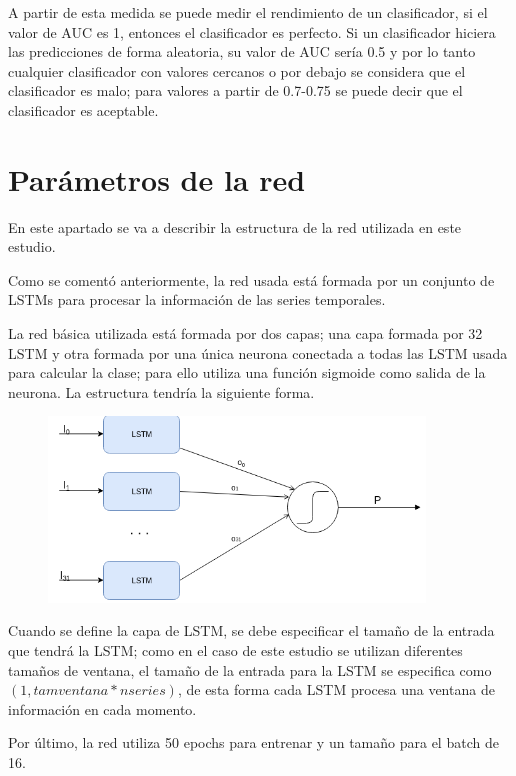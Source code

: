 A partir de esta medida se puede medir el rendimiento de un clasificador, si el valor de AUC es 1, entonces el clasificador es perfecto. Si un clasificador hiciera las predicciones de forma aleatoria, su valor de AUC sería 0.5 y por lo tanto cualquier clasificador con valores cercanos o por debajo se considera que el clasificador es malo; para valores a partir de 0.7-0.75 se puede decir que el clasificador es aceptable.

\section{Parámetros de la red}
En este apartado se va a describir la estructura de la red utilizada en este estudio.\newline

Como se comentó anteriormente, la red usada está formada por un conjunto de LSTMs para procesar la información de las series temporales.\newline

La red básica utilizada está formada por dos capas; una capa formada por 32 LSTM y otra formada por una única neurona conectada a todas las LSTM usada para calcular la clase; para ello utiliza una función sigmoide como salida de la neurona. La estructura tendría la siguiente forma.\newline

\begin{figure}[h]
	\centering
	\includegraphics[width=100mm]{imagenes/Estructura_Red.png}
	\label{fig:63}
\end{figure}
\verticalspace
Cuando se define la capa de LSTM, se debe especificar el tamaño de la entrada que tendrá la LSTM; como en el caso de este estudio se utilizan diferentes tamaños de ventana, el tamaño de la entrada para la LSTM se especifica como $(1, tamventana * nseries )$, de esta forma cada LSTM procesa una ventana de información en cada momento.\newline

Por último, la red utiliza 50 epochs para entrenar y un tamaño para el batch de 16.